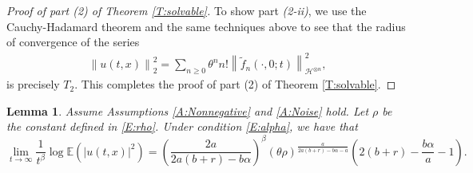 \documentclass[a4paper,11pt]{article}
\numberwithin{equation}{section}
\numberwithin{equation}{section}
\theoremstyle{plain}
\newtheorem{lemma}[theorem]{Lemma}
\theoremstyle{definition}
\newcommand{\Norm}[1]{\left\|  #1   \right\|}
\begin{document}
\begin{proof}[Proof of part (2) of Theorem \ref{T:solvable}]
  To show part \textit{(2-ii)}, we use the Cauchy-Hadamard theorem and the same techniques above to see that the radius of convergence of the series
  \begin{align*}
    \Norm{u(t,x)}_2^2 = \sum_{n \ge 0} \theta^n n! \Norm{\tilde{f}_n(\cdot,0;t)}_{ \mathcal{H}^{\otimes n }}^2,
  \end{align*}
  is precisely $T_2$. This completes the proof of part (2) of Theorem \ref{T:solvable}.
\end{proof}

\begin{lemma} \label{L:p=2}
   Assume Assumptions \ref{A:Nonnegative} and \ref{A:Noise} hold. Let $\rho$ be the constant defined
   in \eqref{E:rho}. Under condition \eqref{E:alpha}, we have that
  \begin{equation}
      \lim_{t \to \infty} \frac{1}{t^\beta} \log \mathbb{E}(|u(t,x)|^2) \nonumber
    = \left( \frac{2a}{2a(b+r)- b\alpha} \right)^\beta (\theta\rho)^{\frac{a}{2a(b+r)-b\alpha-a}}\left(2(b+r)-\frac{b\alpha}{a}-1\right).
  \end{equation}
\end{lemma}
\end{document}
